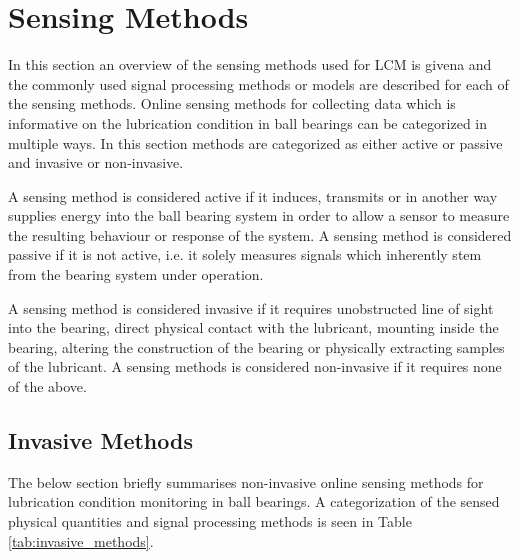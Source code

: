 \section{Sensing Methods}
In this section an overview of the sensing methods used for LCM is givena and the commonly used signal processing methods or models are described for each of the sensing methods. Online sensing methods for collecting data which is informative on the lubrication condition in ball bearings can be categorized in multiple ways. In this section methods are categorized as either active or passive and invasive or non-invasive.

A sensing method is considered active if it induces, transmits or in another way supplies energy into the ball bearing system in order to allow a sensor to measure the resulting behaviour or response of the system. A sensing method is considered passive if it is not active, i.e. it solely measures signals which inherently stem from the bearing system under operation.

A sensing method is considered invasive if it requires unobstructed line of sight into the bearing, direct physical contact with the lubricant, mounting inside the bearing, altering the construction of the bearing or physically extracting samples of the lubricant. A sensing methods is considered non-invasive if it requires none of the above.

\subsection{Invasive Methods}
The below section briefly summarises non-invasive online sensing methods for lubrication condition monitoring in ball bearings. A categorization of the sensed physical quantities and signal processing methods is seen in Table \ref{tab:invasive_methods}.

